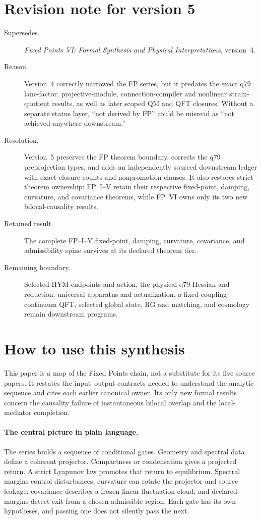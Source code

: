 \documentclass[11pt]{article}
\begin{document}
\section*{Revision note for version 5}
\begin{description}
\item[Supersedes.] \emph{Fixed Points VI: Formal Synthesis and Physical
Interpretations}, version~4.
\item[Reason.] Version~4 correctly narrowed the FP series, but it predates the
exact q79 lane-factor, projective-module, connection-compiler and nonlinear
strain-quotient results, as well as later scoped QM and QFT closures. Without a
separate status layer, ``not derived by FP'' could be misread as ``not achieved
anywhere downstream.''
\item[Resolution.] Version~5 preserves the FP theorem boundary, corrects the
q79 preprojection types, and adds an independently sourced downstream ledger
with exact closure counts and nonpromotion clauses. It also restores strict
theorem ownership: FP~I--V retain their respective fixed-point, damping,
curvature, and covariance theorems, while FP~VI owns only its two new
bilocal-causality results.
\item[Retained result.] The complete FP--I--V fixed-point, damping, curvature,
covariance, and admissibility spine survives at its declared theorem tier.
\item[Remaining boundary.] Selected HYM endpoints and action, the physical q79
Hessian and reduction, universal apparatus and actualization, a fixed-coupling
continuum QFT, selected global state, RG and matching, and cosmology remain
downstream programs.
\end{description}

\section*{How to use this synthesis}
This paper is a map of the Fixed Points chain, not a substitute for its five
source papers.  It restates the input--output contracts needed to understand
the analytic sequence and cites each earlier canonical owner. Its only new
formal results concern the causality
failure of instantaneous bilocal overlap and the local-mediator completion.

\paragraph{The central picture in plain language.}
The series builds a sequence of conditional gates.  Geometry and spectral
data define a coherent projector.  Compactness or condensation gives a
projected return.  A strict Lyapunov law promotes that return to equilibrium.
Spectral margins control disturbances; curvature can rotate the projector and
source leakage; covariance describes a frozen linear fluctuation cloud; and
declared margins detect exit from a chosen admissible region.  Each gate has
its own hypotheses, and passing one does not silently pass the next.
\end{document}
